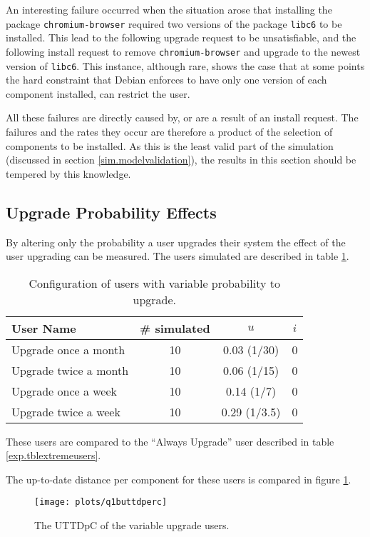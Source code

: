 An interesting failure occurred when the situation arose that installing the package \texttt{chromium-browser} required two versions of the package \texttt{libc6} to be installed. 
This lead to the following upgrade request to be unsatisfiable, and the following install request to remove \texttt{chromium-browser} and upgrade to the newest version of \texttt{libc6}.
This instance, although rare, shows the case that at some points the hard constraint that Debian enforces to have only one version of each component installed,
can restrict the user.

All these failures are directly caused by, or are a result of an install request.
The failures and the rates they occur are therefore a product of the selection of components to be installed.
As this is the least valid part of the simulation (discussed in section \ref{sim.modelvalidation}), the results in this section should be tempered by this knowledge. 


\subsection{Upgrade Probability Effects}
By altering only the probability a user upgrades their system the effect of the user upgrading can be measured.
The users simulated are described in table \ref{exp.tblq1busers}.
\begin{table}[h!]
\centering
\begin{tabular}{|l | c | c | c |}
\hline
User Name 				& \# simulated 	& $u$ 		& $i$ 			\\ \hline
Upgrade once a month	& 10 			& 0.03 (1/30)			& 0				 \\
Upgrade twice a month	& 10 			& 0.06 (1/15)		& 0				\\
Upgrade once a week		& 10 			& 0.14 (1/7)		& 0				 \\
Upgrade twice a week 	& 10 			& 0.29 (1/3.5)		& 0				\\ \hline
\end{tabular}
\caption{Configuration of users with variable probability to upgrade.}
\label{exp.tblq1busers}
\end{table}
These users are compared to the ``Always Upgrade'' user described in table \ref{exp.tblextremeusers}.

The up-to-date distance per component for these users is compared in figure \ref{exp.q1buttdperc}.
\begin{figure}[htp]
\begin{center}
  \texttt{[image: plots/q1buttdperc]}
  \caption{The UTTDpC of the variable upgrade users.}
  \label{exp.q1buttdperc}
\end{center}
\end{figure}


